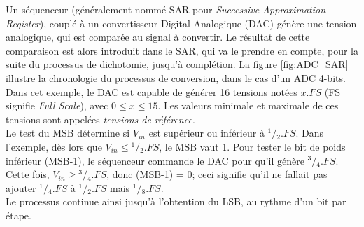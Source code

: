 Un séquenceur (généralement nommé SAR pour \textit{Successive Approximation Register}), couplé à un convertisseur Digital-Analogique (DAC) génère une tension analogique, qui est comparée au signal à convertir.
Le résultat de cette comparaison est alors introduit dans le SAR, qui va le prendre en compte, pour la suite du processus de dichotomie, jusqu'à complétion. La figure \ref{fig:ADC_SAR} illustre la chronologie du processus de conversion, dans le cas d'un ADC 4-bits.\\
Dans cet exemple, le DAC est capable de générer 16 tensions notées $x.FS$ (FS signifie \textit{Full Scale}), avec $0 \leqslant x \leqslant 15$. Les valeurs minimale et maximale de ces tensions sont appelées \textit{tensions de référence}.\\
Le test du MSB détermine si $V_{in}$ est supérieur ou inférieur à $\scriptstyle {}^1\!/\!_2.FS$. Dans l'exemple, dès lors que $V_{in} \leqslant \scriptstyle {}^1\!/\!_2.FS$, le MSB vaut 1. Pour tester le bit de poids inférieur (MSB-1), le séquenceur commande le DAC pour qu'il génère $\scriptstyle {}^3\!/\!_4.FS$. Cette fois,  $V_{in} \geqslant \scriptstyle {}^3\!/\!_4.FS$, donc (MSB-1) = 0; ceci signifie qu'il ne fallait pas ajouter $\scriptstyle {}^1\!/\!_4.FS$ à 
$\scriptstyle {}^1\!/\!_2.FS$ mais $\scriptstyle {}^1\!/\!_8.FS$.\\
Le processus continue ainsi jusqu'à l'obtention du LSB, au rythme d'un bit par étape.

